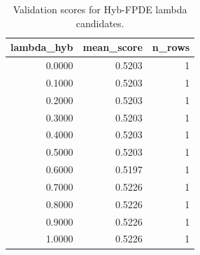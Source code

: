 \begin{table}[t]
\caption{Validation scores for Hyb-FPDE lambda candidates.}
\label{tab:lambda_distribution_computed}
\centering
\begin{tabular}{rrr}
\toprule
lambda\_hyb & mean\_score & n\_rows \\
\midrule
0.0000 & 0.5203 & 1 \\
0.1000 & 0.5203 & 1 \\
0.2000 & 0.5203 & 1 \\
0.3000 & 0.5203 & 1 \\
0.4000 & 0.5203 & 1 \\
0.5000 & 0.5203 & 1 \\
0.6000 & 0.5197 & 1 \\
0.7000 & 0.5226 & 1 \\
0.8000 & 0.5226 & 1 \\
0.9000 & 0.5226 & 1 \\
1.0000 & 0.5226 & 1 \\
\bottomrule
\end{tabular}

\end{table}
